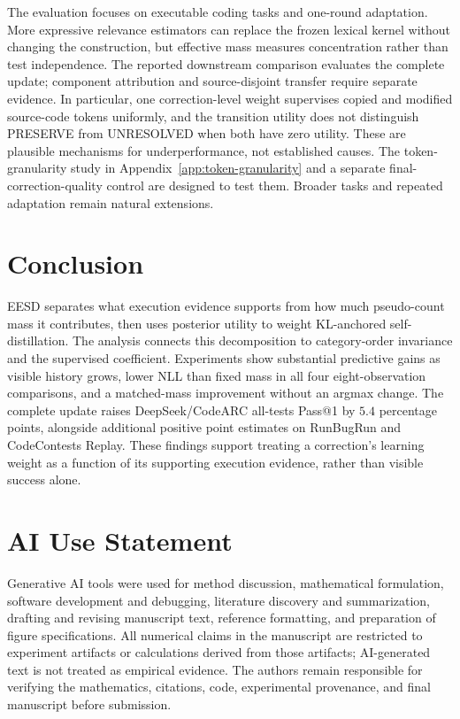 \documentclass{article}
\newcommand{\method}{\textsc{EESD}\xspace}
\begin{document}
The evaluation focuses on executable coding tasks and one-round adaptation. More expressive relevance estimators can replace the frozen lexical kernel without changing the construction, but effective mass measures concentration rather than test independence. The reported downstream comparison evaluates the complete update; component attribution and source-disjoint transfer require separate evidence. In particular, one correction-level weight supervises copied and modified source-code tokens uniformly, and the transition utility does not distinguish PRESERVE from UNRESOLVED when both have zero utility. These are plausible mechanisms for underperformance, not established causes. The token-granularity study in Appendix~\ref{app:token-granularity} and a separate final-correction-quality control are designed to test them. Broader tasks and repeated adaptation remain natural extensions.

\section{Conclusion}
\label{sec:conclusion}

\method separates what execution evidence supports from how much pseudo-count mass it contributes, then uses posterior utility to weight KL-anchored self-distillation. The analysis connects this decomposition to category-order invariance and the supervised coefficient. Experiments show substantial predictive gains as visible history grows, lower NLL than fixed mass in all four eight-observation comparisons, and a matched-mass improvement without an argmax change. The complete update raises DeepSeek/CodeARC all-tests Pass@1 by $5.4$ percentage points, alongside additional positive point estimates on RunBugRun and CodeContests Replay. These findings support treating a correction's learning weight as a function of its supporting execution evidence, rather than visible success alone.

\label{pg:main-end}
\clearpage
\section*{AI Use Statement}
\label{pg:statements-start}
Generative AI tools were used for method discussion, mathematical formulation, software development and debugging, literature discovery and summarization, drafting and revising manuscript text, reference formatting, and preparation of figure specifications. All numerical claims in the manuscript are restricted to experiment artifacts or calculations derived from those artifacts; AI-generated text is not treated as empirical evidence. The authors remain responsible for verifying the mathematics, citations, code, experimental provenance, and final manuscript before submission.
\end{document}
